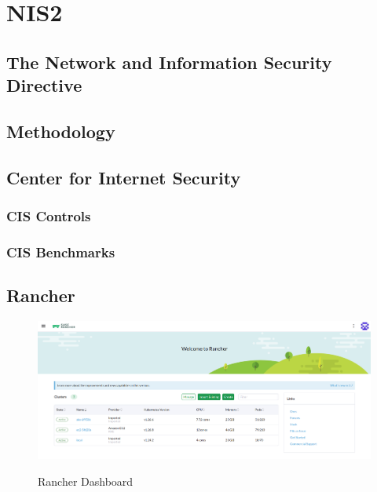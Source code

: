 %
%

\pagebreak
\section{NIS2}

\onehalfspacing

\subsection{The Network and Information Security Directive}

\subsection{Methodology}

\subsection{Center for Internet Security}

\subsubsection{CIS Controls}

\subsubsection{CIS Benchmarks}

\subsection{Rancher}

\begin{figure}[H]
\centering
\caption {Rancher Dashboard}
\includegraphics[width=\linewidth]{images/rancher-dashboard.png}
\label{fig:rancherDashboard}
\end{figure}

